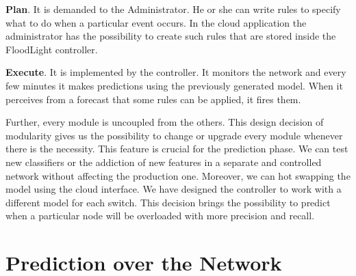 \documentclass[12pt]{article}
\begin{document}
\textbf{Plan}. It is demanded to the Administrator.
He or she can write rules to specify what to do when a particular event occurs.
In the cloud application the administrator has the possibility to create such rules that are stored inside the FloodLight controller.


\textbf{Execute}. It is implemented by the controller. 
It monitors the network and every few minutes it makes predictions using the previously generated model.
When it perceives from a forecast that some rules can be applied, it fires them.


Further, every module is uncoupled from the others. 
This design decision of modularity gives us the possibility to change or upgrade every module whenever there is the necessity.
This feature is crucial for the prediction phase.
We can test new classifiers or the addiction of new features in a separate and controlled network without affecting the production one. Moreover, we can hot swapping the model using the cloud interface.
We have designed the controller to work with a different model for each switch. 
This decision brings the possibility to predict when a particular node will be overloaded with more precision and recall.\\

 







\section{Prediction over the Network}
\end{document}
